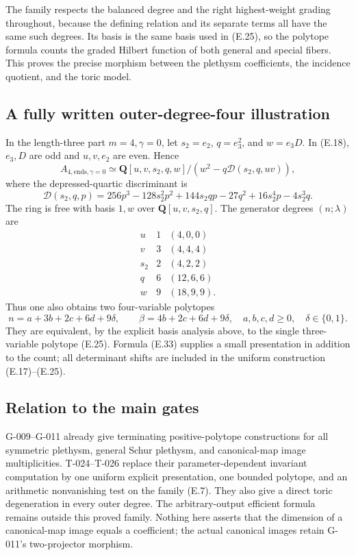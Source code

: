\documentclass[
  10pt,
]{article}
\begin{document}
The family respects the balanced degree and the right highest-weight
grading throughout, because the defining relation and its separate terms
all have the same such degrees. Its basis is the same basis used in
(E.25), so the polytope formula counts the graded Hilbert function of
both general and special fibers. This proves the precise morphism
between the plethysm coefficients, the incidence quotient, and the toric
model.

\subsection{A fully written outer-degree-four
illustration}\label{a-fully-written-outer-degree-four-illustration}

In the length-three part \(m=4,\gamma=0\), let \(s_2=e_2\), \(q=e_3^2\),
and \(w=e_3D\). In (E.18), \(e_3,D\) are odd and \(u,v,e_2\) are even.
Hence \[
A_{4,\mathrm{ends},\gamma=0}
\simeq\mathbf Q[u,v,s_2,q,w]/(w^2-q\mathcal D(s_2,q,uv)),
\tag{E.33}
\] where the depressed-quartic discriminant is \[
\mathcal D(s_2,q,p)
=256p^3-128s_2^2p^2+144s_2qp-27q^2
+16s_2^4p-4s_2^3q.
\tag{E.34}
\] The ring is free with basis \(1,w\) over \(\mathbf Q[u,v,s_2,q]\).
The generator degrees \((n;\lambda)\) are \[
\begin{array}{c|c|c}
u&1&(4,0,0)\\
v&3&(4,4,4)\\
s_2&2&(4,2,2)\\
q&6&(12,6,6)\\
w&9&(18,9,9).
\end{array}
\tag{E.35}
\] Thus one also obtains two four-variable polytopes \[
n=a+3b+2c+6d+9\delta,\qquad
\beta=4b+2c+6d+9\delta,
\quad a,b,c,d\ge0,\quad\delta\in\{0,1\}.
\tag{E.36}
\] They are equivalent, by the explicit basis analysis above, to the
single three-variable polytope (E.25). Formula (E.33) supplies a small
presentation in addition to the count; all determinant shifts are
included in the uniform construction (E.17)--(E.25).

\subsection{Relation to the main
gates}\label{relation-to-the-main-gates}

G-009--G-011 already give terminating positive-polytope constructions
for all symmetric plethysm, general Schur plethysm, and canonical-map
image multiplicities. T-024--T-026 replace their parameter-dependent
invariant computation by one uniform explicit presentation, one bounded
polytope, and an arithmetic nonvanishing test on the family (E.7). They
also give a direct toric degeneration in every outer degree. The
arbitrary-output efficient formula remains outside this proved family.
Nothing here asserts that the dimension of a canonical-map image equals
a coefficient; the actual canonical images retain G-011's two-projector
morphism.
\end{document}
